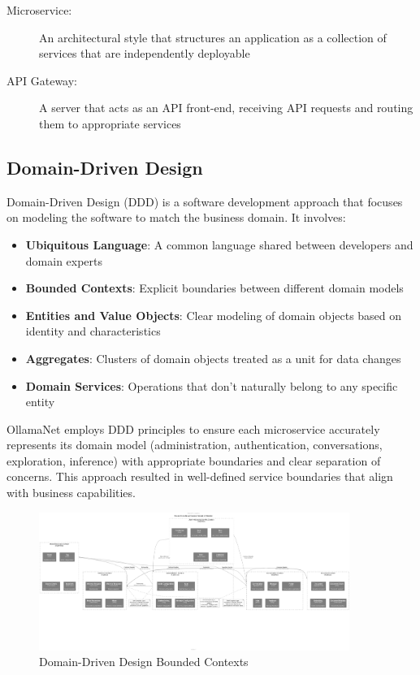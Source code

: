 \begin{terminology}
\begin{description}
    \item[Microservice:] An architectural style that structures an application as a collection of services that are independently deployable
    \item[API Gateway:] A server that acts as an API front-end, receiving API requests and routing them to appropriate services
\end{description}
\end{terminology}

\subsection{Domain-Driven Design}

Domain-Driven Design (DDD) is a software development approach that focuses on modeling the software to match the business domain. It involves:

\begin{itemize}
    \item \textbf{Ubiquitous Language}: A common language shared between developers and domain experts
    \item \textbf{Bounded Contexts}: Explicit boundaries between different domain models
    \item \textbf{Entities and Value Objects}: Clear modeling of domain objects based on identity and characteristics
    \item \textbf{Aggregates}: Clusters of domain objects treated as a unit for data changes
    \item \textbf{Domain Services}: Operations that don't naturally belong to any specific entity
\end{itemize}

OllamaNet employs DDD principles to ensure each microservice accurately represents its domain model (administration, authentication, conversations, exploration, inference) with appropriate boundaries and clear separation of concerns. This approach resulted in well-defined service boundaries that align with business capabilities.

\begin{figure}
    \centering
    \includegraphics[width=0.9\textwidth]{./Chapter02/figures/DDD_Bounded_Contexts.png}
    \caption{Domain-Driven Design Bounded Contexts}
    \label{fig:ddd-contexts}
\end{figure}

